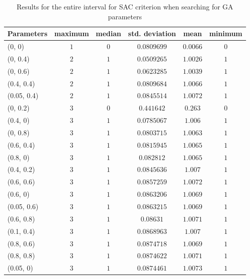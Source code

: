 \begin{center}
\addtolength{\tabcolsep}{-3pt}
{\scriptsize

\begin{longtable}{| l | c | c | c | c | c |}
\caption[ble]{Results for the entire interval for SAC criterion when searching for GA parameters}\label{tabSACParameters}\\
\hline
Parameters & maximum & median & std. deviation & mean & minimum \\ \hline
\endhead
(0, 0) & $1$ & $0$ & $0.0809699$ & $0.0066$ & $0$ \\ \hline
(0, 0.4) & $2$ & $1$ & $0.0509265$ & $1.0026$ & $1$ \\ \hline
(0, 0.6) & $2$ & $1$ & $0.0623285$ & $1.0039$ & $1$ \\ \hline
(0.4, 0.4) & $2$ & $1$ & $0.0809684$ & $1.0066$ & $1$ \\ \hline
(0.05, 0.4) & $2$ & $1$ & $0.0845514$ & $1.0072$ & $1$ \\ \hline
(0, 0.2) & $3$ & $0$ & $0.441642$ & $0.263$ & $0$ \\ \hline
(0.4, 0) & $3$ & $1$ & $0.0785067$ & $1.006$ & $1$ \\ \hline
(0, 0.8) & $3$ & $1$ & $0.0803715$ & $1.0063$ & $1$ \\ \hline
(0.6, 0.4) & $3$ & $1$ & $0.0815945$ & $1.0065$ & $1$ \\ \hline
(0.8, 0) & $3$ & $1$ & $0.082812$ & $1.0065$ & $1$ \\ \hline
(0.4, 0.2) & $3$ & $1$ & $0.0845636$ & $1.007$ & $1$ \\ \hline
(0.6, 0.6) & $3$ & $1$ & $0.0857259$ & $1.0072$ & $1$ \\ \hline
(0.6, 0) & $3$ & $1$ & $0.0863206$ & $1.0069$ & $1$ \\ \hline
(0.05, 0.6) & $3$ & $1$ & $0.0863215$ & $1.0069$ & $1$ \\ \hline
(0.6, 0.8) & $3$ & $1$ & $0.08631$ & $1.0071$ & $1$ \\ \hline
(0.1, 0.4) & $3$ & $1$ & $0.0868963$ & $1.007$ & $1$ \\ \hline
(0.8, 0.6) & $3$ & $1$ & $0.0874718$ & $1.0069$ & $1$ \\ \hline
(0.8, 0.8) & $3$ & $1$ & $0.0874622$ & $1.0071$ & $1$ \\ \hline
(0.05, 0) & $3$ & $1$ & $0.0874461$ & $1.0073$ & $1$ \\ \hline

\end{longtable}}
\end{center}
